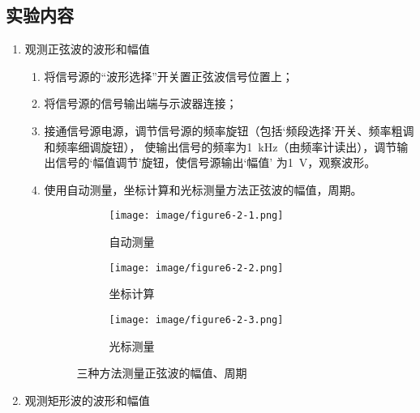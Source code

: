 \documentclass[UTF8]{article}
\begin{document}
        \subsection{实验内容}
            \begin{enumerate}[label=\textbf{\arabic*}.]
                \item 观测正弦波的波形和幅值
                \begin{enumerate}[label=\textbf{\alph*}.]
                    \item 将信号源的“波形选择”开关置正弦波信号位置上；
                    \item 将信号源的信号输出端与示波器连接；
                    \item 接通信号源电源，调节信号源的频率旋钮（包括‘频段选择’开关、频率粗调和频率细调旋钮），
                    使输出信号的频率为\SI{1}{kHz}（由频率计读出），调节输出信号的‘幅值调节’旋钮，使信号源输出‘幅值’ 
                    为\SI{1}{V}，观察波形。
                    \item 使用自动测量，坐标计算和光标测量方法正弦波的幅值，周期。
                    \begin{figure}[H]
                        \centering
                        \begin{subfigure}[H]{0.45\textwidth}
                            \centering
                            \texttt{[image: image/figure6-2-1.png]}
                            \caption{自动测量}
                        \end{subfigure}
                        \hfill
                        \begin{subfigure}[H]{0.45\textwidth}
                            \centering
                            \texttt{[image: image/figure6-2-2.png]}
                            \caption{坐标计算}
                        \end{subfigure}
                        \begin{subfigure}[H]{0.45\textwidth}
                            \centering
                            \texttt{[image: image/figure6-2-3.png]}
                            \caption{光标测量}
                        \end{subfigure}
                        \caption{三种方法测量正弦波的幅值、周期}
                    \end{figure}
                \end{enumerate}
                \item 观测矩形波的波形和幅值

\end{enumerate}
\end{document}
